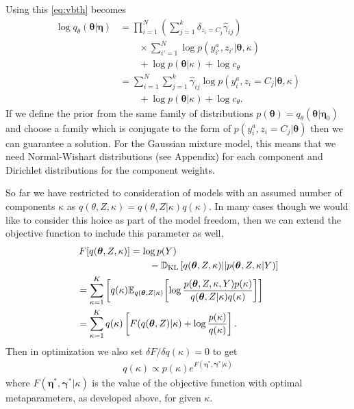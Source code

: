 \documentclass[aps,showpacs,twocolumn,prd,superscriptaddress,nofootinbib]{revtex4}
\newcommand{\nn}{\nonumber}
\newcommand{\E}[1]{{\mathbb E}_{#1}\!}
\begin{document}
Using this \eqref{eq:vbth} becomes
\begin{align}
  \log q_\theta(\bm\theta|\bm\eta)
  &=\prod_{i=1}^N\left(\sum_{j=1}^k\delta_{z_i{=}C_j}\hat\gamma_{ij}\right)\nn\\
  &\qquad\times\sum_{i'=1}^N\log p(y_{i'}^a,z_{i'}|\bm\theta,\kappa)\nn\\
  &\qquad+\log p(\bm\theta|\kappa)+\log c_\theta\nn\\
  &=\sum_{i=1}^N\sum_{j=1}^k\hat\gamma_{ij}\log p(y_i^a,z_i{=}C_j|\bm\theta,\kappa)\nn\\
  &\qquad+\log p(\bm\theta|\kappa)+\log c_\theta.\label{eq:qthmix}
\end{align}
If we define the prior from the same family of distributions $p(\bm\theta)=q_\theta(\bm\theta|\bm\eta_0)$ and choose a family which is conjugate to the form of $p(y_i^a,z_i{=}C_j|\bm\theta)$ then we can guarantee a solution. For the Gaussian mixture model, this means that we need Normal-Wishart distributions (see Appendix) for each component and Dirichlet distributions for the component weights.

So far we have restricted to consideration of models with an assumed number of components $\kappa$ as $q(\theta,Z,\kappa)=q(\theta,Z|\kappa)q(\kappa)$.  In many cases though we would like to consider this hoice as part of the model freedom, then we can extend the objective function to include this parameter as well,
\begin{align*}
  F[q(\bm\theta,Z,\kappa)]\mkern-100mu &\mkern100mu=\log p(Y)\nn\\
  &\mkern100mu\qquad-\mathbb{D}_{\mathrm{KL}}\left[q(\bm\theta,Z,\kappa)||p(\bm\theta,Z,\kappa|Y)\right]\nn\\
  &=\sum_{\kappa=1}^K\left[q(\kappa)\E{q(\bm\theta,Z|\kappa)}\left[\log\frac{p(\bm\theta,Z,\kappa,Y)p(\kappa)}{q(\bm\theta,Z|\kappa)q(\kappa)}\right]\right]\nn\\
  &=\sum_{\kappa=1}^Kq(\kappa)\left[F(q(\bm\theta,Z)|\kappa)+\log\frac{p(\kappa)}{q(\kappa)}\right].
\end{align*}
Then in optimization we also set $\delta F/\delta q(\kappa)=0$ to get
\begin{align*}
    q(\kappa)\propto p(\kappa)e^{F(\bm\eta^*,\bm\gamma^*|\kappa)}
\end{align*}
where $F(\bm\eta^*,\bm\gamma^*|\kappa)$ is the value of the objective function with optimal metaparameters, as developed above, for given $\kappa$.
\end{document}

